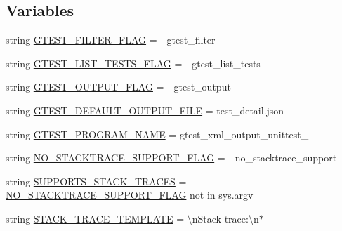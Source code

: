 \subsection*{Variables}
\begin{DoxyCompactItemize}
\item 
string \mbox{\hyperlink{namespacegoogletest_1_1test_1_1googletest-json-output-unittest_ad3af23a9ccf0ebe620b208fd8028cd9f}{G\+T\+E\+S\+T\+\_\+\+F\+I\+L\+T\+E\+R\+\_\+\+F\+L\+AG}} = \textquotesingle{}-\/-\/gtest\+\_\+filter\textquotesingle{}
\item 
string \mbox{\hyperlink{namespacegoogletest_1_1test_1_1googletest-json-output-unittest_ac9ead9899fa6b1498f0046ce22223996}{G\+T\+E\+S\+T\+\_\+\+L\+I\+S\+T\+\_\+\+T\+E\+S\+T\+S\+\_\+\+F\+L\+AG}} = \textquotesingle{}-\/-\/gtest\+\_\+list\+\_\+tests\textquotesingle{}
\item 
string \mbox{\hyperlink{namespacegoogletest_1_1test_1_1googletest-json-output-unittest_a2de4d9571a3c3adbcf7dd134b380db3f}{G\+T\+E\+S\+T\+\_\+\+O\+U\+T\+P\+U\+T\+\_\+\+F\+L\+AG}} = \textquotesingle{}-\/-\/gtest\+\_\+output\textquotesingle{}
\item 
string \mbox{\hyperlink{namespacegoogletest_1_1test_1_1googletest-json-output-unittest_a997ce8a508963089542253489995ecf6}{G\+T\+E\+S\+T\+\_\+\+D\+E\+F\+A\+U\+L\+T\+\_\+\+O\+U\+T\+P\+U\+T\+\_\+\+F\+I\+LE}} = \textquotesingle{}test\+\_\+detail.\+json\textquotesingle{}
\item 
string \mbox{\hyperlink{namespacegoogletest_1_1test_1_1googletest-json-output-unittest_ab1bd944e9241f41fa7c815fa8aed09e4}{G\+T\+E\+S\+T\+\_\+\+P\+R\+O\+G\+R\+A\+M\+\_\+\+N\+A\+ME}} = \textquotesingle{}gtest\+\_\+xml\+\_\+output\+\_\+unittest\+\_\+\textquotesingle{}
\item 
string \mbox{\hyperlink{namespacegoogletest_1_1test_1_1googletest-json-output-unittest_a0cae314d11e0b6bed86c51236e914245}{N\+O\+\_\+\+S\+T\+A\+C\+K\+T\+R\+A\+C\+E\+\_\+\+S\+U\+P\+P\+O\+R\+T\+\_\+\+F\+L\+AG}} = \textquotesingle{}-\/-\/no\+\_\+stacktrace\+\_\+support\textquotesingle{}
\item 
string \mbox{\hyperlink{namespacegoogletest_1_1test_1_1googletest-json-output-unittest_a8a12475c3d21f609c1f752f907c5f5d7}{S\+U\+P\+P\+O\+R\+T\+S\+\_\+\+S\+T\+A\+C\+K\+\_\+\+T\+R\+A\+C\+ES}} = \mbox{\hyperlink{namespacegoogletest_1_1test_1_1googletest-json-output-unittest_a0cae314d11e0b6bed86c51236e914245}{N\+O\+\_\+\+S\+T\+A\+C\+K\+T\+R\+A\+C\+E\+\_\+\+S\+U\+P\+P\+O\+R\+T\+\_\+\+F\+L\+AG}} not in sys.\+argv
\item 
string \mbox{\hyperlink{namespacegoogletest_1_1test_1_1googletest-json-output-unittest_aa816e704196f6e9f87c1b301b7987c81}{S\+T\+A\+C\+K\+\_\+\+T\+R\+A\+C\+E\+\_\+\+T\+E\+M\+P\+L\+A\+TE}} = \textquotesingle{}\textbackslash{}n\+Stack trace\+:\textbackslash{}n$\ast$\textquotesingle{}

\end{DoxyCompactItemize}
